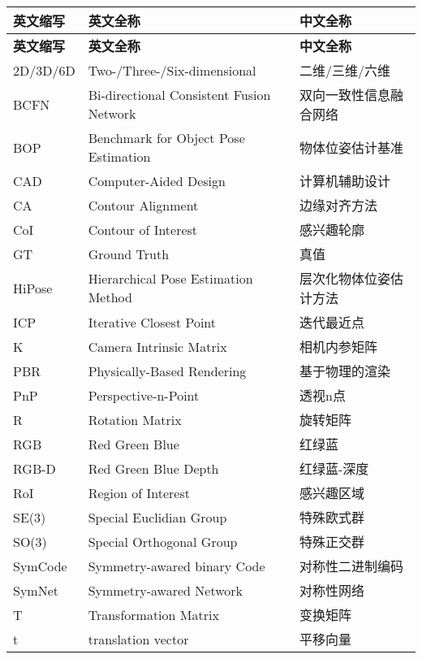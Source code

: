 \cleardoublepage
{}
\begin{center}
    \begin{longtable}{m{2cm}m{8cm}m{5cm}}
        \toprule
        \textbf{英文缩写}&\textbf{英文全称}&\textbf{中文全称}\\
        \midrule
        \endfirsthead
        \toprule
        \textbf{英文缩写}&\textbf{英文全称}&\textbf{中文全称}\\
        \midrule
        \endhead 
        \bottomrule
        \endfoot
        \bottomrule
        \endlastfoot

        2D/3D/6D&Two-/Three-/Six-dimensional&二维/三维/六维\\
        BCFN&Bi-directional Consistent Fusion Network&双向一致性信息融合网络\\
        BOP&Benchmark for Object Pose Estimation&物体位姿估计基准\\
        CAD&Computer-Aided Design&计算机辅助设计\\
        CA&Contour Alignment&边缘对齐方法\\
        CoI&Contour of Interest&感兴趣轮廓\\
        GT&Ground Truth&真值\\
        HiPose&Hierarchical Pose Estimation Method&层次化物体位姿估计方法\\
        ICP&Iterative Closest Point&迭代最近点\\
        K&Camera Intrinsic Matrix&相机内参矩阵\\
        PBR&Physically-Based Rendering&基于物理的渲染\\
        PnP&Perspective-n-Point&透视n点\\
        R&Rotation Matrix&旋转矩阵\\
        RGB&Red Green Blue&红绿蓝\\
        RGB-D&Red Green Blue Depth&红绿蓝-深度\\
        RoI&Region of Interest&感兴趣区域\\
        SE(3)&Special Euclidian Group&特殊欧式群\\
        SO(3)&Special Orthogonal Group&特殊正交群\\
        SymCode&Symmetry-awared binary Code&对称性二进制编码\\
        SymNet&Symmetry-awared Network&对称性网络\\
        T&Transformation Matrix&变换矩阵\\
        t&translation vector&平移向量\\
        
	\end{longtable}
\end{center}



